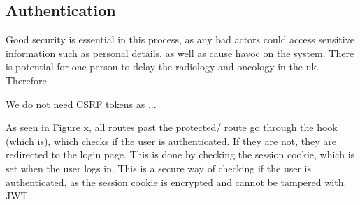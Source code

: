 \subsection{Authentication}
Good security is essential in this process, as any bad actors could access sensitive information such as personal details, as well as cause havoc on the system. There is potential for one person to delay the radiology and oncology in the uk. Therefore 

We do not need CSRF tokens as ...

As seen in Figure x, all routes past the protected/ route go through the hook (which is), which checks if the user is authenticated. If they are not, they are redirected to the login page. This is done by checking the session cookie, which is set when the user logs in. This is a secure way of checking if the user is authenticated, as the session cookie is encrypted and cannot be tampered with. JWT. 

\noindent
{}